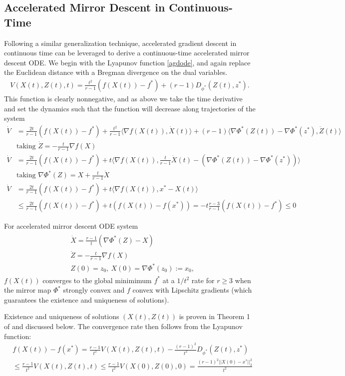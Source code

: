 \subsection{Accelerated Mirror Descent in Continuous-Time}
Following a similar generalization technique, accelerated gradient descent in continuous time can be leveraged to derive a continuous-time accelerated mirror descent ODE. We begin with the Lyapunov function \eqref{agdode}, and again replace the Euclidean distance with a Bregman divergence on the dual variables. 
\begin{align}
\label{amdlyap} 
V(X(t),Z(t),t) = \frac{t^2}{r-1} (f(X(t)) - f^*) + (r-1) D_{\phi^*} (Z(t), z^*).
 \end{align}
This function is clearly nonnegative, and as above we take the time derivative and set the dynamics such that the function will decrease along trajectories of the system
\begin{align*} 
\dot V &= \frac{2t}{r-1} (f(X(t)) - f^*) + \frac{t^2}{r-1} \langle \nabla f(X(t)), \dot X(t)\rangle + (r-1) \langle \nabla \Phi^* (Z(t)) -  \nabla \Phi^* (z^*), \dot{Z}(t) \rangle\\
&\text{taking }\dot Z = -\frac{t}{r-1} \nabla f(X)\\
\dot V &= \frac{2t}{r-1} (f(X(t)) - f^*) + t \langle \nabla f(X(t)), \frac{t}{r-1} \dot X(t) - (\nabla \Phi^* (Z(t)) -  \nabla \Phi^* (z^*)) \rangle\\
&\text{taking } \nabla \Phi^* (Z) = X + \frac{t}{r-1}\dot X\\
\dot V &= \frac{2t}{r-1} (f(X(t)) - f^*) + t \langle \nabla f(X(t)), x^* - X(t)   \rangle\\
&\leq \frac{2t}{r-1} (f(X(t)) - f^*) + t ( f(X(t))- f(x^*))= -t \frac{r-3}{r-1} (f(X(t)) - f^*) \leq 0
\end{align*} 
\begin{theorem}
For accelerated mirror descent ODE system
\begin{align}
\label{amdode}
\begin{split}
&\dot X = \frac{r-1}{t} (\nabla \Phi^*(Z) - X)\\
&\dot Z = -\frac{t}{r-1} \nabla f(X)\\
&Z(0) = z_0,~X(0) = \nabla \Phi^*(z_0) := x_0,
\end{split}
\end{align}
$f(X(t))$ converges to the global minimimum $f^*$ at a $1/t^2$ rate for $r\geq 3$ when the mirror map $\Phi^*$ strongly convex and $f$ convex with Lipschitz gradients (which guarantees the existence and uniqueness of solutions).
\end{theorem}
\proofstart
Existence and uniqueness of solutions $(X(t),Z(t))$ is proven in Theorem 1 of \citet{krichene2015accelerated} and discussed below. The convergence rate then follows from the Lyapunov function:
\begin{align*}
    & f(X(t)) - f(x^*) = \frac{r-1}{t^2} V(X(t),Z(t), t) - \frac{(r-1)^2}{t^2} D_{\phi^*} (Z(t), z^*) \\
    & \leq \frac{r-1}{t^2} V(X(t),Z(t), t) \leq \frac{r-1}{t^2} V(X(0),Z(0), 0) = \frac{(r-1)^2 ||X(0)-x^*||_2^2}{ t^2}
\end{align*}
\proofend

